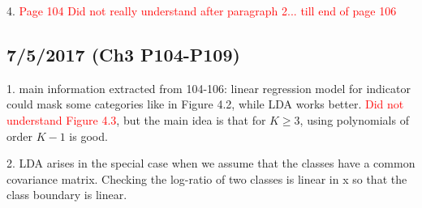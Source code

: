 \documentclass[a4paper, 12pt]{article}
\begin{document}
4. \textcolor{red}{Page 104 Did not really understand after paragraph 2... till end of page 106 }

\subsection*{7/5/2017 (Ch3 P104-P109)}

1. main information extracted from 104-106: linear regression model for indicator could mask some categories like in Figure 4.2, while LDA works better.  \textcolor{red}{Did not understand Figure 4.3}, but the main idea is that for $K \ge 3$, using polynomials of order $K-1$ is good.

2. LDA arises in the special case when we assume that the classes have a common covariance matrix. Checking the log-ratio of two classes is linear in x so that the class boundary is linear.
\end{document}
